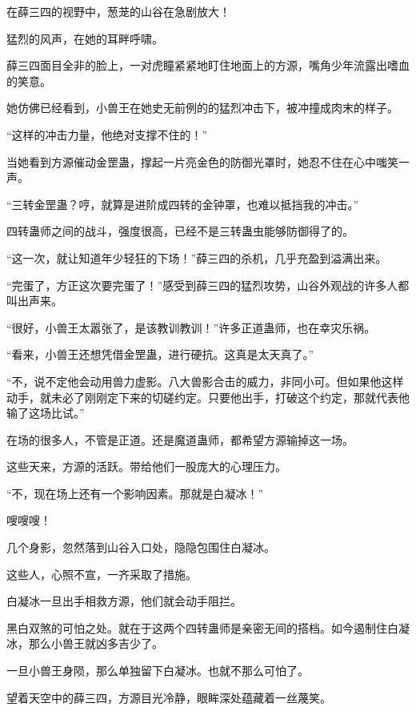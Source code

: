 
\begin{this_body}



在薛三四的视野中，葱茏的山谷在急剧放大！

猛烈的风声，在她的耳畔呼啸。

薛三四面目全非的脸上，一对虎瞳紧紧地盯住地面上的方源，嘴角少年流露出嗜血的笑意。

她仿佛已经看到，小兽王在她史无前例的的猛烈冲击下，被冲撞成肉末的样子。

“这样的冲击力量，他绝对支撑不住的！”

当她看到方源催动金罡蛊，撑起一片亮金色的防御光罩时，她忍不住在心中嗤笑一声。

“三转金罡蛊？哼，就算是进阶成四转的金钟罩，也难以抵挡我的冲击。”

四转蛊师之间的战斗，强度很高，已经不是三转蛊虫能够防御得了的。

“这一次，就让知道年少轻狂的下场！”薛三四的杀机，几乎充盈到溢满出来。

“完蛋了，方正这次要完蛋了！”感受到薛三四的猛烈攻势，山谷外观战的许多人都叫出声来。

“很好，小兽王太嚣张了，是该教训教训！”许多正道蛊师，也在幸灾乐祸。

“看来，小兽王还想凭借金罡蛊，进行硬抗。这真是太天真了。”

“不，说不定他会动用兽力虚影。八大兽影合击的威力，非同小可。但如果他这样动手，就未必了刚刚定下来的切磋约定。只要他出手，打破这个约定，那就代表他输了这场比试。”

在场的很多人，不管是正道。还是魔道蛊师，都希望方源输掉这一场。

这些天来，方源的活跃。带给他们一股庞大的心理压力。

“不，现在场上还有一个影响因素。那就是白凝冰！”

嗖嗖嗖！

几个身影，忽然落到山谷入口处，隐隐包围住白凝冰。

这些人，心照不宣，一齐采取了措施。

白凝冰一旦出手相救方源，他们就会动手阻拦。

黑白双煞的可怕之处。就在于这两个四转蛊师是亲密无间的搭档。如今遏制住白凝冰，那么小兽王就凶多吉少了。

一旦小兽王身陨，那么单独留下白凝冰。也就不那么可怕了。

望着天空中的薛三四，方源目光冷静，眼眸深处蕴藏着一丝蔑笑。


\end{this_body}
